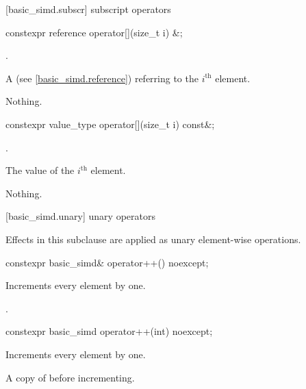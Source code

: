 [basic_simd.subscr]{ subscript operators}

\begin{itemdecl}
constexpr reference operator[](size_t i) &;
\end{itemdecl}

\begin{itemdescr}
  \pnum\expects
  .

  \pnum\returns
  A  (see \ref{basic_simd.reference}) referring to the $i^\text{th}$ element.

  \pnum\throws Nothing.
\end{itemdescr}

\begin{itemdecl}
constexpr value_type operator[](size_t i) const&;
\end{itemdecl}

\begin{itemdescr}
  \pnum\expects
  .

  \pnum\returns
  The value of the $i^\text{th}$ element.

  \pnum\throws Nothing.
\end{itemdescr}

[basic_simd.unary]{ unary operators}

\pnum
Effects in this subclause are applied as unary element-wise operations.

\begin{itemdecl}
constexpr basic_simd& operator++() noexcept;
\end{itemdecl}

\begin{itemdescr}
  \pnum{}

  \pnum\effects
  Increments every element by one.

  \pnum\returns
  .
\end{itemdescr}

\begin{itemdecl}
constexpr basic_simd operator++(int) noexcept;
\end{itemdecl}

\begin{itemdescr}
  \pnum{}

  \pnum\effects
  Increments every element by one.

  \pnum\returns
  A copy of  before incrementing.
\end{itemdescr}

